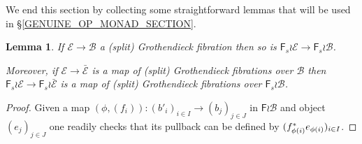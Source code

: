 \documentclass[a4paper,10pt
,draft
]{article}%
\numberwithin{equation}{section}
\numberwithin{figure}{section}
\newtheorem{lemma}[equation]{Lemma}%
\theoremstyle{definition} %
\newcommand{\Fin}{\mathsf{F}}%
\newcommand{\1}{\ensuremath{\mathbbm 1}}%
\begin{document}
We end this section by collecting some straightforward lemmas
that will be used in \S \ref{GENUINE_OP_MONAD_SECTION}.

\begin{lemma}\label{FWRGROTH LEM}
	If $\mathcal{E} \to \mathcal{B}$ a (split) Grothendieck fibration then so is 
	$\Fin_s \wr \mathcal{E} \to \Fin_s \wr \mathcal{B}$.

	Moreover, if 
	$\mathcal{E} \to \bar{\mathcal{E}}$ is a map of (split) Grothendieck fibrations over $\mathcal{B}$ then
	$\Fin_s \wr \mathcal{E} \to \Fin_s \wr \bar{\mathcal{E}}$ is a map of (split) Grothendieck fibrations over $\Fin_s \wr \mathcal{B}$.
\end{lemma}

\begin{proof}
Given a map 
$(\phi,(f_i)) \colon
(b'_i)_{i \in I} \to (b_j)_{j \in J}$ 
in $\Fin \wr \mathcal{B}$
and object $(e_j)_{j \in J}$ one readily checks that its pullback can be defined by $(f^{\**}_{\phi(i)}e_{\phi(i)})_{i \in I}$.
\end{proof}
\end{document}

